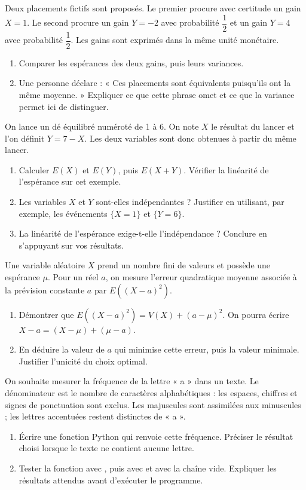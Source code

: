 
Deux placements fictifs sont proposés. Le premier procure avec certitude un gain $X=1$. Le second procure un gain $Y=-2$ avec probabilité $\dfrac12$ et un gain $Y=4$ avec probabilité $\dfrac12$. Les gains sont exprimés dans la même unité monétaire.
\begin{enumerate}[label=\arabic*.]
\item Comparer les espérances des deux gains, puis leurs variances.
\item Une personne déclare : « Ces placements sont équivalents puisqu’ils ont la même moyenne. » Expliquer ce que cette phrase omet et ce que la variance permet ici de distinguer.
\end{enumerate}
On lance un dé équilibré numéroté de 1 à 6. On note $X$ le résultat du lancer et l’on définit $Y=7-X$. Les deux variables sont donc obtenues à partir du même lancer.
\begin{enumerate}[label=\arabic*.]
\item Calculer $E(X)$ et $E(Y)$, puis $E(X+Y)$. Vérifier la linéarité de l’espérance sur cet exemple.
\item Les variables $X$ et $Y$ sont-elles indépendantes ? Justifier en utilisant, par exemple, les événements $\{X=1\}$ et $\{Y=6\}$.
\item La linéarité de l’espérance exige-t-elle l’indépendance ? Conclure en s’appuyant sur vos résultats.
\end{enumerate}
Une variable aléatoire $X$ prend un nombre fini de valeurs et possède une espérance $\mu$. Pour un réel $a$, on mesure l’erreur quadratique moyenne associée à la prévision constante $a$ par $E((X-a)^2)$.
\begin{enumerate}[label=\arabic*.]
\item Démontrer que $E((X-a)^2)=V(X)+(a-\mu)^2$. On pourra écrire $X-a=(X-\mu)+(\mu-a)$.
\item En déduire la valeur de $a$ qui minimise cette erreur, puis la valeur minimale. Justifier l’unicité du choix optimal.
\end{enumerate}
On souhaite mesurer la fréquence de la lettre « a » dans un texte. Le dénominateur est le nombre de caractères alphabétiques : les espaces, chiffres et signes de ponctuation sont exclus. Les majuscules sont assimilées aux minuscules ; les lettres accentuées restent distinctes de « a ».
\begin{enumerate}[label=\arabic*.]
\item Écrire une fonction Python qui renvoie cette fréquence. Préciser le résultat choisi lorsque le texte ne contient aucune lettre.
\item Tester la fonction avec , puis avec  et avec la chaîne vide. Expliquer les résultats attendus avant d’exécuter le programme.
\end{enumerate}
